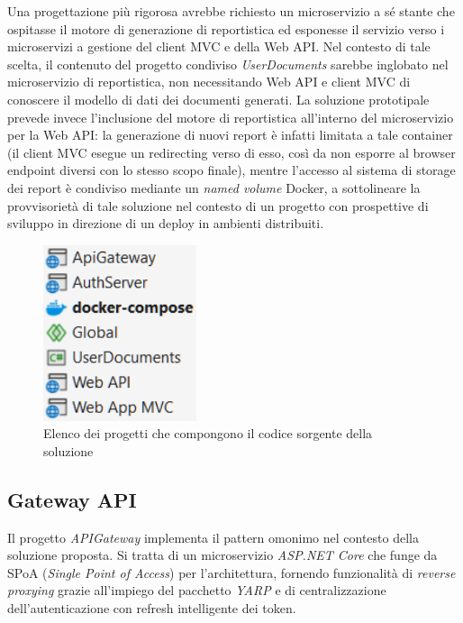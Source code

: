 Una progettazione più rigorosa avrebbe richiesto un microservizio a sé stante che ospitasse il motore di generazione di reportistica ed esponesse il servizio verso i microservizi a gestione del client MVC e della Web API. Nel contesto di tale scelta, il contenuto del progetto condiviso \emph{UserDocuments} sarebbe inglobato nel microservizio di reportistica, non necessitando Web API e client MVC di conoscere il modello di dati dei documenti generati.
La soluzione prototipale prevede invece l'inclusione del motore di reportistica all'interno del microservizio per la Web API: la generazione di nuovi report è infatti limitata a tale container (il client MVC esegue un redirecting verso di esso, così da non esporre al browser endpoint diversi con lo stesso scopo finale), mentre l'accesso al sistema di storage dei report è condiviso mediante un \emph{named volume} Docker, a sottolineare la provvisorietà di tale soluzione nel contesto di un progetto con prospettive di sviluppo in direzione di un deploy in ambienti distribuiti.

\begin{figure}[H]
    \centering
    \includegraphics[width=0.4\textwidth]{fig/elenco_progetti.png}
    \caption[Elenco progetti]{Elenco dei progetti che compongono il codice sorgente della soluzione}
\end{figure}

\subsection{Gateway API}
Il progetto \emph{APIGateway} implementa il pattern omonimo nel contesto della soluzione proposta. Si tratta di un microservizio \emph{ASP.NET Core} che funge da SPoA (\emph{Single Point of Access}) per l'architettura, fornendo funzionalità di \emph{reverse proxying} grazie all'impiego del pacchetto \emph{YARP} e di centralizzazione dell'autenticazione con refresh intelligente dei token.

